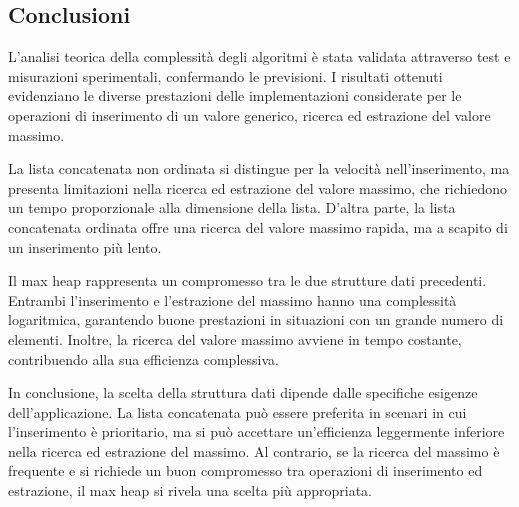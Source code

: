 \documentclass{article}
\begin{document}
\subsection{Conclusioni}

\label{sec:conclusioni}

L'analisi teorica della complessità degli algoritmi è stata validata attraverso test e misurazioni sperimentali, confermando le previsioni. I risultati ottenuti evidenziano le diverse prestazioni delle implementazioni considerate per le operazioni di inserimento di un valore generico, ricerca ed estrazione del valore massimo.

La lista concatenata non ordinata si distingue per la velocità nell'inserimento, ma presenta limitazioni nella ricerca ed estrazione del valore massimo, che richiedono un tempo proporzionale alla dimensione della lista. D'altra parte, la lista concatenata ordinata offre una ricerca del valore massimo rapida, ma a scapito di un inserimento più lento.

Il max heap rappresenta un compromesso tra le due strutture dati precedenti. Entrambi l'inserimento e l'estrazione del massimo hanno una complessità logaritmica, garantendo buone prestazioni in situazioni con un grande numero di elementi. Inoltre, la ricerca del valore massimo avviene in tempo costante, contribuendo alla sua efficienza complessiva.

In conclusione, la scelta della struttura dati dipende dalle specifiche esigenze dell'applicazione. La lista concatenata può essere preferita in scenari in cui l'inserimento è prioritario, ma si può accettare un'efficienza leggermente inferiore nella ricerca ed estrazione del massimo. Al contrario, se la ricerca del massimo è frequente e si richiede un buon compromesso tra operazioni di inserimento ed estrazione, il max heap si rivela una scelta più appropriata.
\end{document}
